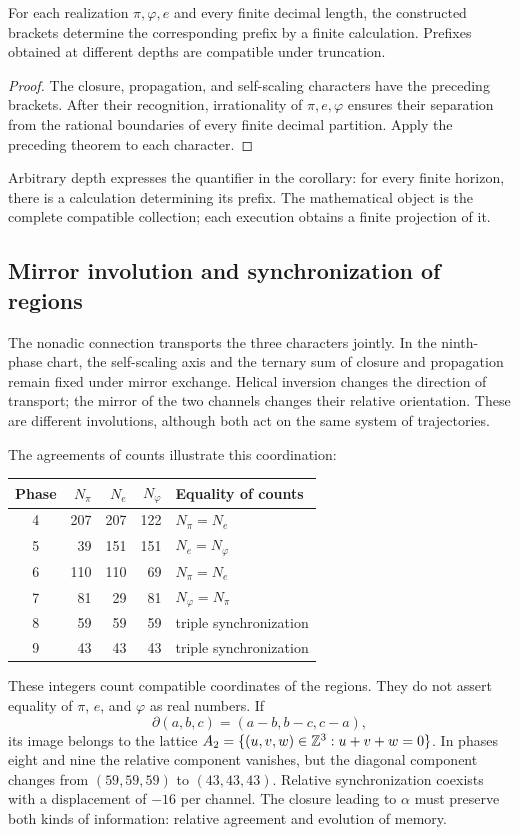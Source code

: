 \begin{corollary}
\label{gen:prefijos-regionales}
For each realization \(\pi,\varphi,e\) and every finite decimal
length, the constructed brackets determine the corresponding prefix
by a finite calculation. Prefixes obtained at different depths
are compatible under truncation.
\end{corollary}
\begin{proof}
The closure, propagation, and self-scaling characters have the
preceding brackets. After their recognition, irrationality of \(\pi,e,\varphi\)
ensures their separation from the rational boundaries of every finite decimal
partition. Apply the preceding theorem to each character.
\end{proof}
Arbitrary depth expresses the quantifier in the corollary: for every
finite horizon, there is a calculation determining its prefix. The
mathematical object is the complete compatible collection; each execution obtains a
finite projection of it.

\subsection{Mirror involution and synchronization of regions}

The nonadic connection transports the three characters jointly. In the ninth-phase chart, the self-scaling axis and the ternary sum of closure and propagation remain fixed under mirror exchange. Helical inversion changes the direction of transport; the mirror of the two channels changes their relative orientation. These are different involutions, although both act on the same system of trajectories.

The agreements of counts illustrate this coordination:
\begin{center}
\begin{tabular}{@{}c rrr l@{}}\toprule
Phase&\(N_\pi\)&\(N_e\)&\(N_\varphi\)&Equality of counts\\\midrule
4&207&207&122&\(N_\pi=N_e\)\\
5&39&151&151&\(N_e=N_\varphi\)\\
6&110&110&69&\(N_\pi=N_e\)\\
7&81&29&81&\(N_\varphi=N_\pi\)\\
8&59&59&59&triple synchronization\\
9&43&43&43&triple synchronization\\\bottomrule
\end{tabular}
\end{center}
These integers count compatible coordinates of the regions. They do not assert equality of \(\pi\), \(e\), and \(\varphi\) as real numbers. If
\[
 \partial(a,b,c)=(a-b,b-c,c-a),
\]
its image belongs to the lattice \(A_2=\{(u,v,w)\in\mathbb Z^3:u+v+w=0\}\). In phases eight and nine the relative component vanishes, but the diagonal component changes from \((59,59,59)\) to \((43,43,43)\). Relative synchronization coexists with a displacement of \(-16\) per channel. The closure leading to \(\alpha\) must preserve both kinds of information: relative agreement and evolution of memory.

